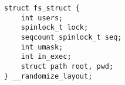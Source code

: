
\begin{lstlisting}
struct fs_struct {
	int users;
	spinlock_t lock;
	seqcount_spinlock_t seq;
	int umask;
	int in_exec;
	struct path root, pwd;
} __randomize_layout;
\end{lstlisting}

